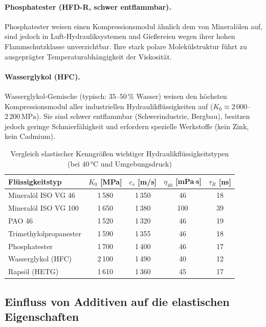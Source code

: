 ﻿\documentclass[a4paper,12pt]{scrreprt}
\theoremstyle{definition}
\begin{document}
\paragraph{Phosphatester (HFD-R, schwer entflammbar).}
Phosphatester weisen einen Kompressionsmodul ähnlich dem von Mineralölen
auf, sind jedoch in Luft-Hydrauliksystemen und Gießereien wegen ihrer
hohen Flammschutzklasse unverzichtbar. Ihre stark polare Molekülstruktur
führt zu ausgeprägter Temperaturabhängigkeit der Viskosität.

\paragraph{Wasserglykol (HFC).}
Wasserglykol-Gemische (typisch: $35$--$50\,\%$ Wasser) weisen den
höchsten Kompressionsmodul aller industriellen Hydraulikflüssigkeiten
auf ($K_0 \approx 2\,000$--$2\,200\,\mathrm{MPa}$). Sie sind schwer
entflammbar (Schwerindustrie, Bergbau), besitzen jedoch geringe
Schmierfähigkeit und erfordern spezielle Werkstoffe (kein Zink, kein
Cadmium).

\begin{table}[H]
  \centering
  \caption{Vergleich elastischer Kenngrößen wichtiger Hydraulikflüssigkeitstypen
    (bei $40\, °\mathrm{C}$ und Umgebungsdruck)}
  \label{tab:fluid_vergleich}
  \begin{tabular}{lcccc}
    \toprule
    Flüssigkeitstyp
      & $K_0$ [MPa]
      & $c_s$ [m/s]
      & $\eta_{40}$ [mPa$\cdot$s]
      & $\tau_R$ [ns] \\
    \midrule
    Mineralöl ISO VG 46    & 1\,580 & 1\,350 & 46  & 18 \\
    Mineralöl ISO VG 100   & 1\,650 & 1\,380 & 100 & 39 \\
    PAO 46                 & 1\,520 & 1\,320 & 46  & 19 \\
    Trimethylolpropanester & 1\,590 & 1\,355 & 46  & 18 \\
    Phosphatester          & 1\,700 & 1\,400 & 46  & 17 \\
    Wasserglykol (HFC)     & 2\,100 & 1\,490 & 40  & 12 \\
    Rapsöl (HETG)          & 1\,610 & 1\,360 & 45  & 17 \\
    \bottomrule
  \end{tabular}
\end{table}

\subsection{Einfluss von Additiven auf die elastischen Eigenschaften}
\end{document}
